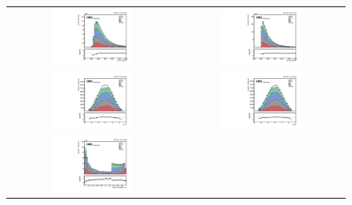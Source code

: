 \begin{figure}[t]
  \centering
  \begin{tabular}{cc}
    \includegraphics[width=0.5\textwidth]{Figures/dataMC_trig_antiDBT/pt_j0.pdf} &
    \includegraphics[width=0.5\textwidth]{Figures/dataMC_trig_antiDBT/pt_j1.pdf} \\
     \includegraphics[width=0.5\textwidth]{Figures/dataMC_trig_antiDBT/eta_j0.pdf} &
    \includegraphics[width=0.5\textwidth]{Figures/dataMC_trig_antiDBT/eta_j1.pdf} \\
     \includegraphics[width=0.5\textwidth]{Figures/dataMC_trig_antiDBT/doubleSV_j0.pdf} &

\end{tabular}
\end{figure}
